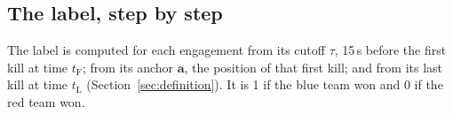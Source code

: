 \subsection{The label, step by step}\label{sec:label-def}

The label is computed for each engagement from its cutoff $\tau$, 15\,s before the first kill at
time $t_{\mathrm{F}}$; from its anchor $\mathbf{a}$, the position of that first kill; and from its
last kill at time $t_{\mathrm{L}}$ (Section~\ref{sec:definition}). It is 1 if the blue team won and 0
if the red team won.

